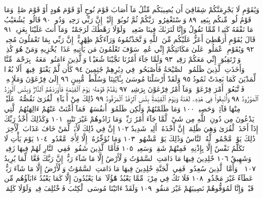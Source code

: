 وَيَٰقَوْمِ لَا يَجْرِمَنَّكُمْ شِقَاقِيٓ أَن يُصِيبَكُم مِّثْلُ مَآ أَصَابَ
قَوْمَ نُوحٍ أَوْ قَوْمَ هُودٍ أَوْ قَوْمَ صَٰلِحࣲۚ وَمَا قَوْمُ لُوطࣲ مِّنكُم
بِبَعِيدࣲ ٨٩ وَٱسْتَغْفِرُوا۟ رَبَّكُمْ ثُمَّ تُوبُوٓا۟ إِلَيْهِۚ إِنَّ رَبِّي
رَحِيمࣱ وَدُودࣱ ٩٠ قَالُوا۟ يَٰشُعَيْبُ مَا نَفْقَهُ كَثِيرࣰا مِّمَّا تَقُولُ
وَإِنَّا لَنَرَىٰكَ فِينَا ضَعِيفࣰاۖ وَلَوْلَا رَهْطُكَ لَرَجَمْنَٰكَۖ وَمَآ أَنتَ
عَلَيْنَا بِعَزِيزࣲ ٩١ قَالَ يَٰقَوْمِ أَرَهْطِيٓ أَعَزُّ عَلَيْكُم مِّنَ ٱللَّهِ
وَٱتَّخَذْتُمُوهُ وَرَآءَكُمْ ظِهْرِيًّاۖ إِنَّ رَبِّي بِمَا تَعْمَلُونَ
مُحِيطࣱ ٩٢ وَيَٰقَوْمِ ٱعْمَلُوا۟ عَلَىٰ مَكَانَتِكُمْ إِنِّي عَٰمِلࣱۖ
سَوْفَ تَعْلَمُونَ مَن يَأْتِيهِ عَذَابࣱ يُخْزِيهِ وَمَنْ هُوَ كَٰذِبࣱۖ
وَٱرْتَقِبُوٓا۟ إِنِّي مَعَكُمْ رَقِيبࣱ ٩٣ وَلَمَّا جَآءَ أَمْرُنَا نَجَّيْنَا
شُعَيْبࣰا وَٱلَّذِينَ ءَامَنُوا۟ مَعَهُۥ بِرَحْمَةࣲ مِّنَّا وَأَخَذَتِ
ٱلَّذِينَ ظَلَمُوا۟ ٱلصَّيْحَةُ فَأَصْبَحُوا۟ فِي دِيَٰرِهِمْ جَٰثِمِينَ ٩٤
كَأَن لَّمْ يَغْنَوْا۟ فِيهَآۗ أَلَا بُعْدࣰا لِّمَدْيَنَ كَمَا بَعِدَتْ ثَمُودُ ٩٥
وَلَقَدْ أَرْسَلْنَا مُوسَىٰ بِـَٔايَٰتِنَا وَسُلْطَٰنࣲ مُّبِينٍ ٩٦ إِلَىٰ فِرْعَوْنَ
وَمَلَإِي۟هِۦ فَٱتَّبَعُوٓا۟ أَمْرَ فِرْعَوْنَۖ وَمَآ أَمْرُ فِرْعَوْنَ بِرَشِيدࣲ ٩٧
يَقْدُمُ قَوْمَهُۥ يَوْمَ ٱلْقِيَٰمَةِ فَأَوْرَدَهُمُ ٱلنَّارَۖ وَبِئْسَ ٱلْوِرْدُ
ٱلْمَوْرُودُ ٩٨ وَأُتْبِعُوا۟ فِي هَٰذِهِۦ لَعْنَةࣰ وَيَوْمَ ٱلْقِيَٰمَةِۚ بِئْسَ
ٱلرِّفْدُ ٱلْمَرْفُودُ ٩٩ ذَٰلِكَ مِنْ أَنۢبَآءِ ٱلْقُرَىٰ نَقُصُّهُۥ عَلَيْكَۖ
مِنْهَا قَآئِمࣱ وَحَصِيدࣱ ١٠٠ وَمَا ظَلَمْنَٰهُمْ وَلَٰكِن ظَلَمُوٓا۟
أَنفُسَهُمْۖ فَمَآ أَغْنَتْ عَنْهُمْ ءَالِهَتُهُمُ ٱلَّتِي يَدْعُونَ مِن دُونِ
ٱللَّهِ مِن شَيْءࣲ لَّمَّا جَآءَ أَمْرُ رَبِّكَۖ وَمَا زَادُوهُمْ غَيْرَ تَتْبِيبࣲ ١٠١
وَكَذَٰلِكَ أَخْذُ رَبِّكَ إِذَآ أَخَذَ ٱلْقُرَىٰ وَهِيَ ظَٰلِمَةٌۚ إِنَّ أَخْذَهُۥٓ
أَلِيمࣱ شَدِيدٌ ١٠٢ إِنَّ فِي ذَٰلِكَ لَأٓيَةࣰ لِّمَنْ خَافَ عَذَابَ ٱلْأٓخِرَةِۚ
ذَٰلِكَ يَوْمࣱ مَّجْمُوعࣱ لَّهُ ٱلنَّاسُ وَذَٰلِكَ يَوْمࣱ مَّشْهُودࣱ ١٠٣
وَمَا نُؤَخِّرُهُۥٓ إِلَّا لِأَجَلࣲ مَّعْدُودࣲ ١٠٤ يَوْمَ يَأْتِ لَا تَكَلَّمُ نَفْسٌ
إِلَّا بِإِذْنِهِۦۚ فَمِنْهُمْ شَقِيࣱّ وَسَعِيدࣱ ١٠٥ فَأَمَّا ٱلَّذِينَ شَقُوا۟ فَفِي
ٱلنَّارِ لَهُمْ فِيهَا زَفِيرࣱ وَشَهِيقٌ ١٠٦ خَٰلِدِينَ فِيهَا مَا دَامَتِ ٱلسَّمَٰوَٰتُ
وَٱلْأَرْضُ إِلَّا مَا شَآءَ رَبُّكَۚ إِنَّ رَبَّكَ فَعَّالࣱ لِّمَا يُرِيدُ ١٠٧
۞ وَأَمَّا ٱلَّذِينَ سُعِدُوا۟ فَفِي ٱلْجَنَّةِ خَٰلِدِينَ فِيهَا مَا دَامَتِ
ٱلسَّمَٰوَٰتُ وَٱلْأَرْضُ إِلَّا مَا شَآءَ رَبُّكَۖ عَطَآءً غَيْرَ مَجْذُوذࣲ ١٠٨
فَلَا تَكُ فِي مِرْيَةࣲ مِّمَّا يَعْبُدُ هَٰٓؤُلَآءِۚ مَا يَعْبُدُونَ إِلَّا كَمَا يَعْبُدُ
ءَابَآؤُهُم مِّن قَبْلُۚ وَإِنَّا لَمُوَفُّوهُمْ نَصِيبَهُمْ غَيْرَ مَنقُوصࣲ ١٠٩
وَلَقَدْ ءَاتَيْنَا مُوسَى ٱلْكِتَٰبَ فَٱخْتُلِفَ فِيهِۚ وَلَوْلَا كَلِمَةࣱ
